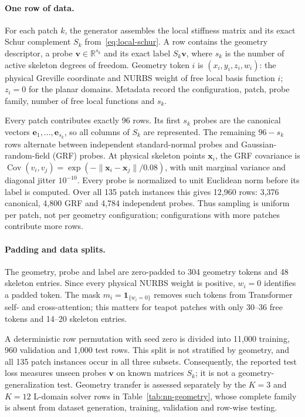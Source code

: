 \documentclass{article}
\newcommand{\vect}[1]{\boldsymbol{#1}}
\newcommand{\R}{\mathbb{R}}
\newcommand{\Sloc}[1]{S_{#1}}                    %
\theoremstyle{plain}
\numberwithin{equation}{section}
\begin{document}
\paragraph{One row of data.}
For each patch $k$, the generator assembles the local stiffness matrix and its
exact Schur complement $\Sloc{k}$ from~\eqref{eq:local-schur}.  A row contains
the geometry descriptor, a probe $\vect v\in\R^{s_k}$ and its exact label
$\Sloc{k}\vect v$, where $s_k$ is the number of active skeleton degrees of
freedom.  Geometry token $i$ is $(x_i,y_i,z_i,w_i)$: the physical Greville
coordinate and NURBS weight of free local basis function $i$; $z_i=0$ for the
planar domains.  Metadata record the configuration, patch, probe family,
number of free local functions and $s_k$.

Every patch contributes exactly 96 rows.  Its first $s_k$ probes are the
canonical vectors $\vect e_1,\ldots,\vect e_{s_k}$, so all columns of
$\Sloc{k}$ are represented.  The remaining $96-s_k$ rows alternate between
independent standard-normal probes and Gaussian-random-field (GRF) probes.  At
physical skeleton points $\vect x_i$, the GRF covariance is
$\operatorname{Cov}(v_i,v_j)=\exp(-\|\vect x_i-\vect x_j\|/0.08)$, with unit
marginal variance and diagonal jitter $10^{-10}$.  Every probe is normalized
to unit Euclidean norm before its label is computed.  Over all 135 patch
instances this gives 12,960 rows: 3,376 canonical, 4,800 GRF and 4,784
independent probes.  Thus sampling is uniform per patch, not per geometry
configuration; configurations with more patches contribute more rows.

\paragraph{Padding and data splits.}
The geometry, probe and label are zero-padded to 304 geometry tokens and 48
skeleton entries.  Since every physical NURBS weight is positive, $w_i=0$
identifies a padded token.  The mask $m_i=\mathbf 1_{\{w_i=0\}}$ removes such
tokens from Transformer self- and cross-attention; this matters for teapot
patches with only 30--36 free tokens and 14--20 skeleton entries.

A deterministic row permutation with seed zero is divided into 11,000
training, 960 validation and 1,000 test rows.  This split is not stratified by
geometry, and all 135 patch instances occur in all three subsets.  Consequently,
the reported test loss measures unseen probes $\vect v$ on known matrices
$\Sloc{k}$; it is not a geometry-generalization test.  Geometry transfer is
assessed separately by the $K=3$ and $K=12$ L-domain solver rows in
Table~\ref{tab:nn-geometry}, whose complete family is absent from dataset
generation, training, validation and row-wise testing.
\end{document}
